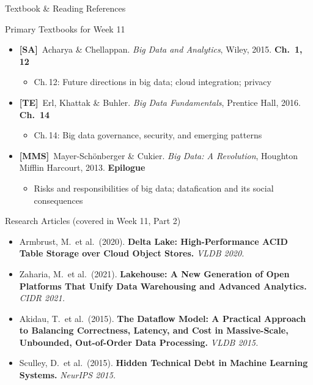 \documentclass[aspectratio=169,10pt]{beamer}
\begin{document}
\begin{frame}{Textbook \& Reading References}
  \begin{block}{Primary Textbooks for Week 11}
    \begin{itemize}
      \item \textbf{[SA]}\ Acharya \& Chellappan. \textit{Big Data and Analytics}, Wiley, 2015.
            \hfill\textbf{Ch.\ 1, 12}
            \begin{itemize}
              \small\item Ch.\,12: Future directions in big data; cloud integration; privacy
            \end{itemize}
      \item \textbf{[TE]}\ Erl, Khattak \& Buhler. \textit{Big Data Fundamentals}, Prentice Hall, 2016.
            \hfill\textbf{Ch.\ 14}
            \begin{itemize}
              \small\item Ch.\,14: Big data governance, security, and emerging patterns
            \end{itemize}
      \item \textbf{[MMS]}\ Mayer-Sch\"{o}nberger \& Cukier. \textit{Big Data: A Revolution}, Houghton Mifflin Harcourt, 2013.
            \hfill\textbf{Epilogue}
            \begin{itemize}
              \small\item Risks and responsibilities of big data; datafication and its social consequences
            \end{itemize}
    \end{itemize}
  \end{block}
  \vspace{4pt}
  \begin{exampleblock}{Research Articles (covered in Week 11, Part 2)}
    \begin{itemize}
      \small
      \item Armbrust, M.\ et al.\ (2020). \textbf{Delta Lake: High-Performance ACID Table Storage over Cloud Object Stores.} \textit{VLDB 2020.}
      \item Zaharia, M.\ et al.\ (2021). \textbf{Lakehouse: A New Generation of Open Platforms That Unify Data Warehousing and Advanced Analytics.} \textit{CIDR 2021.}
      \item Akidau, T.\ et al.\ (2015). \textbf{The Dataflow Model: A Practical Approach to Balancing Correctness, Latency, and Cost in Massive-Scale, Unbounded, Out-of-Order Data Processing.} \textit{VLDB 2015.}
      \item Sculley, D.\ et al.\ (2015). \textbf{Hidden Technical Debt in Machine Learning Systems.} \textit{NeurIPS 2015.}
    \end{itemize}
  \end{exampleblock}
\end{frame}
\end{document}

